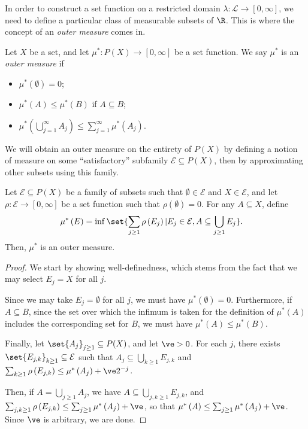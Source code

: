 \documentclass[10pt]{mypackage}
\begin{document}
In order to construct a set function on a restricted domain $\lambda\colon \mathcal{L}\rightarrow [0,\infty]$, we need to define a particular class of measurable subsets of $\R$. This is where the concept of an \textit{outer measure} comes in.
\begin{definition}
  Let $X$ be a set, and let $\mu^{\ast}\colon P\left( X \right)\rightarrow [0,\infty]$ be a set function. We say $\mu^{\ast}$ is an \textit{outer measure} if
  \begin{itemize}
    \item $\mu^{\ast}\left( \emptyset \right)= 0$;
    \item $\mu^{\ast}\left( A \right)\leq \mu^{\ast}\left( B \right)$ if $A\subseteq B$;
    \item $\displaystyle \mu^{\ast}\left( \bigcup_{j=1}^{\infty}A_j \right)\leq \sum_{j=1}^{\infty}\mu^{\ast}\left( A_j \right)$.
  \end{itemize}
\end{definition}
We will obtain an outer measure on the entirety of $P(X)$ by defining a notion of measure on some ``satisfactory'' subfamily $\mathcal{E}\subseteq P(X)$, then by approximating other subsets using this family.
\begin{proposition}
  Let $\mathcal{E}\subseteq P(X)$ be a family of subsets such that $\emptyset\in \mathcal{E}$ and $X\in \mathcal{E}$, and let $\rho\colon \mathcal{E}\rightarrow [0,\infty]$ be a set function such that $\rho\left( \emptyset \right) = 0$. For any $A\subseteq X$, define
  \begin{align*}
    \mu^{\ast}\left( E \right) &= \inf\set{\sum_{j\geq 1}\rho\left( E_j \right) | E_j\in \mathcal{E}, A\subseteq \bigcup_{j\geq 1}E_j}.
  \end{align*}
  Then, $\mu^{\ast}$ is an outer measure.
\end{proposition}
\begin{proof}
  We start by showing well-definedness, which stems from the fact that we may select $E_j = X$ for all $j$.\newline

  Since we may take $E_j = \emptyset$ for all $j$, we must have $\mu^{\ast}\left( \emptyset \right) = 0$. Furthermore, if $A\subseteq B$, since the set over which the infimum is taken for the definition of $\mu^{\ast}\left( A \right)$ includes the corresponding set for $B$, we must have $\mu^{\ast}\left( A \right)\leq \mu^{\ast}\left( B \right)$.\newline

  Finally, let $\set{A_j}_{j\geq 1}\subseteq P(X)$, and let $\ve > 0$. For each $j$, there exists $\set{E_{j,k}}_{k\geq 1}\subseteq \mathcal{E}$ such that $A_j\subseteq \bigcup_{k\geq 1}E_{j,k}$ and $\sum_{k\geq 1}\rho\left( E_{j,k} \right) \leq \mu^{\ast}\left( A_j \right) + \ve 2^{-j}$.\newline

  Then, if $A = \bigcup_{j\geq 1}A_j$, we have $A\subseteq \bigcup_{j,k\geq 1}E_{j,k}$, and $\sum_{j,k\geq 1}\rho\left( E_{j,k} \right) \leq \sum_{j\geq 1}\mu^{\ast}\left( A_j \right) + \ve$, so that $\mu^{\ast}\left( A \right)\leq \sum_{j\geq 1}\mu^{\ast}\left( A_j \right) + \ve$. Since $\ve$ is arbitrary, we are done.
\end{proof}
\end{document}
